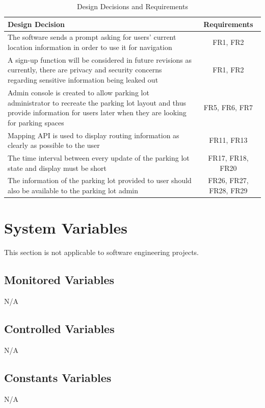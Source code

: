 \documentclass[12pt, titlepage]{article}
\begin{document}
\begin{table}[h!]
\caption{Design Decisions and Requirements}
    \centering
    \begin{tabular}{|p{10cm}|c|}
    \hline
    \textbf{Design Decision} & \textbf{Requirements} \\
    \hline
    The software sends a prompt asking for users' current location information
    in order to use it for navigation & FR1, FR2 \\
    \hline
    A sign-up function will be considered in future revisions as currently,
    there are privacy and security concerns regarding sensitive information
    being leaked out & FR1, FR2\\
    \hline
    Admin console is created to allow parking lot administrator to recreate the
    parking lot layout and thus provide information for users later when they
    are looking for parking spaces & FR5, FR6, FR7\\
    \hline
    Mapping API is used to display routing information as clearly as possible to
    the user & FR11, FR13\\
    \hline
    The time interval between every update of the parking lot state and display
    must be short & FR17, FR18, FR20\\
    \hline
    The information of the parking lot provided to user should also be available
    to the parking lot admin & FR26, FR27, FR28, FR29\\
    \hline
    \end{tabular}
\end{table}

\section{System Variables}

This section is not applicable to software engineering projects.

\subsection{Monitored Variables}
N/A

\subsection{Controlled Variables}
N/A

\subsection{Constants Variables}
N/A
\end{document}
